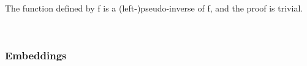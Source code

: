 \ccpad
The function defined by  \ab f  is a (left-)pseudo-inverse
of \ab f, and the proof is trivial.
\ccpad
\begin{code}%
\>[1]\AgdaSpace{}%
\AgdaSymbol{:}\AgdaSpace{}%
\AgdaSymbol{\{}\AgdaSpace{}%
\AgdaSymbol{:}\AgdaSpace{}%
\AgdaSpace{}%
\AgdaSpace{}%
\AgdaSymbol{\}\{}\AgdaSpace{}%
\AgdaSymbol{:}\AgdaSpace{}%
\AgdaSpace{}%
\AgdaSymbol{\}\{}\AgdaSpace{}%
\AgdaSymbol{:}\AgdaSpace{}%
\AgdaSymbol{\}}\AgdaSpace{}%
\AgdaSpace{}%
\AgdaSymbol{(}\AgdaSpace{}%
\AgdaSpace{}%
\AgdaSymbol{)(}\AgdaSpace{}%
\AgdaSymbol{)(}\AgdaSpace{}%
\AgdaSymbol{)}\AgdaSpace{}%
\AgdaSpace{}%
\<%
\\
%
\>[1]\AgdaSpace{}%
\AgdaSymbol{=}\AgdaSpace{}%
\<%
\end{code}



\subsubsection{Embeddings}\label{embeddings}


